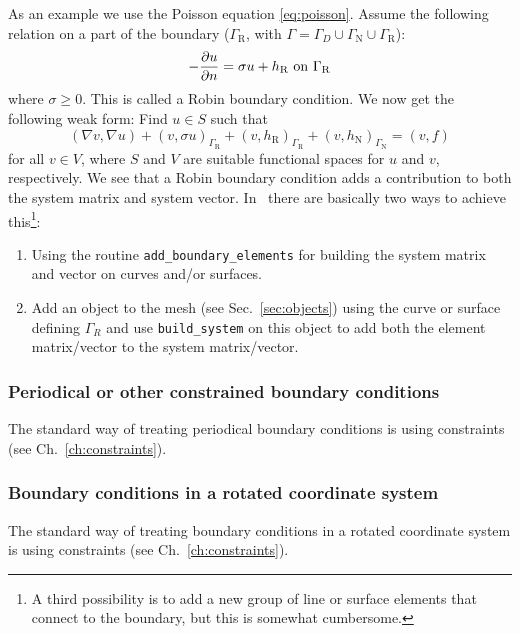 As an example we use the Poisson equation \eqref{eq:poisson}. 
Assume the following relation on a part of the boundary ($\Gamma_\text{R}$,
with $\Gamma=\Gamma_D\cup\Gamma_{\text{N}}\cup\Gamma_{\text{R}}$):
\begin{equation}
   -\dfrac{\partial u}{\partial n} = \sigma u + h_\text{R}\text{ on } \Gamma_\text{R}
\end{equation}
where $\sigma\geq0$.
This is called a Robin boundary condition.
We now get the following weak form: Find $u\in S$ such that
\begin{equation}
   (\nabla v,\nabla u) +(v,\sigma u)_{\Gamma_{\text{R}}}+
(v,h_{\text{R}})_{\Gamma_{\text{R}}}+
(v,h_{\text{N}})_{\Gamma_{\text{N}}}=(v,f)
   \label{eq:weakformpoissonRobin}
\end{equation}
for all $v\in V$, where $S$ and $V$ are suitable functional spaces for $u$ and
$v$, respectively. We see that a Robin boundary condition adds a
contribution to both the system matrix and system vector. In \tfem\ there are
basically two ways to achieve this\footnote{A third possibility is to add a
new group of line
or surface elements that connect to the boundary, but this is somewhat
cumbersome.}:
\begin{enumerate}
   \item Using the routine \texttt{add\_boundary\_elements} for building the
system matrix and vector on curves and/or
 surfaces.
   \item Add an object to the mesh (see Sec.~\ref{sec:objects}) using the curve
or surface defining $\Gamma_R$ and use \texttt{build\_system} on this object
to add both the element matrix/vector to the system matrix/vector.
\end{enumerate}

\subsubsection{Periodical or other constrained boundary conditions}

The standard way of treating periodical boundary conditions is using
constraints (see Ch.~\ref{ch:constraints}).

\subsubsection{Boundary conditions in a rotated coordinate system}

The standard way of treating 
boundary conditions in a rotated coordinate system
is using constraints (see Ch.~\ref{ch:constraints}).

